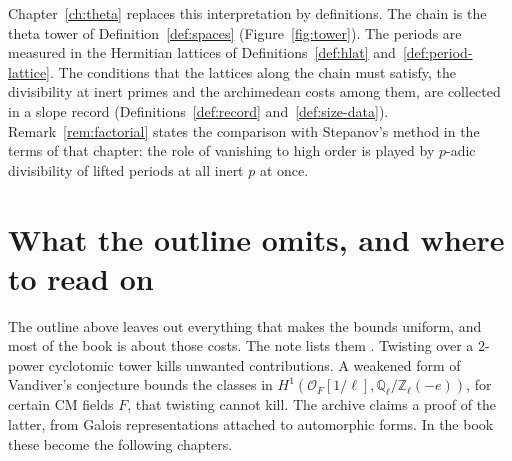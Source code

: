 \documentclass[11pt]{amsbook}
\theoremstyle{plain}
\theoremstyle{definition}
\theoremstyle{remark}
\numberwithin{equation}{section}
\numberwithin{figure}{chapter}
\numberwithin{table}{chapter}
\newcommand{\Q}{\mathbb{Q}}
\newcommand{\Z}{\mathbb{Z}}
\begin{document}
Chapter~\ref{ch:theta} replaces this interpretation by definitions.
The chain is the theta tower of Definition~\ref{def:spaces}
(Figure~\ref{fig:tower}). The periods are measured in the Hermitian
lattices of Definitions~\ref{def:hlat}
and~\ref{def:period-lattice}. The conditions that the lattices
along the chain must satisfy, the
divisibility at inert primes and the archimedean costs among them,
are collected in a slope record (Definitions~\ref{def:record}
and~\ref{def:size-data}). Remark~\ref{rem:factorial} states the
comparison with Stepanov's method in the terms of that chapter: the
role of vanishing to high order is played by $p$-adic divisibility
of lifted periods at all inert $p$ at once.

\section{What the outline omits, and where to read on}
\label{sec:idea-roadmap}

The outline above leaves out everything that makes the bounds
uniform, and most of the book is about those costs. The note lists
them \cite[steps 11, 14--19]{AlpogeRemark2026}. Twisting over a
$2$-power cyclotomic tower kills unwanted contributions. A weakened
form of Vandiver's conjecture bounds the classes in
$H^1(\mathcal O_F[1/\ell], \Q_\ell/\Z_\ell(-e))$, for certain CM
fields $F$, that twisting cannot kill. The archive claims a proof
of the latter, from Galois representations attached to automorphic
forms. In the book these become the following chapters.
\end{document}
